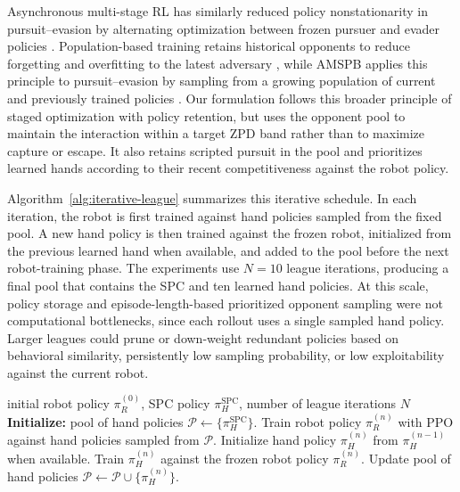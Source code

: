 \documentclass[journal,twoside,web]{ieeecolor2}
\begin{document}
Asynchronous multi-stage RL has similarly reduced policy nonstationarity in pursuit--evasion by alternating optimization between frozen pursuer and evader policies \cite{xiaoAMSDRL2024}. Population-based training retains historical opponents to reduce forgetting and overfitting to the latest adversary \cite{vinyalsAlphaStar2019,jaderbergPopulationGames2019}, while AMSPB applies this principle to pursuit--evasion by sampling from a growing population of current and previously trained policies \cite{sanchezRonceroAMSPB2025}. Our formulation follows this broader principle of staged optimization with policy retention, but uses the opponent pool to maintain the interaction within a target ZPD band rather than to maximize capture or escape. It also retains scripted pursuit in the pool and prioritizes learned hands according to their recent competitiveness against the robot policy.

Algorithm~\ref{alg:iterative-league} summarizes this iterative schedule. In each iteration, the robot is first trained against hand policies sampled from the fixed pool. A new hand policy is then trained against the frozen robot, initialized from the previous learned hand when available, and added to the pool before the next robot-training phase. The experiments use $N=10$ league iterations, producing a final pool that contains the SPC and ten learned hand policies. At this scale, policy storage and episode-length-based prioritized opponent sampling were not computational bottlenecks, since each rollout uses a single sampled hand policy. Larger leagues could prune or down-weight redundant policies based on behavioral similarity, persistently low sampling probability, or low exploitability against the current robot.

\begin{algorithm}[!t]
\caption{Iterative League Training}
\label{alg:iterative-league}
\footnotesize
\begin{algorithmic}[1]
\Require initial robot policy $\pi_R^{(0)}$, SPC policy $\pi_H^{\mathrm{SPC}}$, number of league iterations $N$
\Statex \textbf{Initialize:} pool of hand policies $\mathcal{P}\leftarrow\{\pi_H^{\mathrm{SPC}}\}$.
  \State Train robot policy $\pi_R^{(n)}$ with PPO against hand policies
  \Statex \hspace{\algorithmicindent} sampled from $\mathcal{P}$.
  \State Initialize hand policy $\pi_H^{(n)}$ from $\pi_H^{(n-1)}$ when available.
  \State Train $\pi_H^{(n)}$ against the frozen robot policy $\pi_R^{(n)}$.
  \State Update pool of hand policies $\mathcal{P}\leftarrow\mathcal{P}\cup\{\pi_H^{(n)}\}$.
\EndFor
\end{algorithmic}
\end{algorithm}
\end{document}
